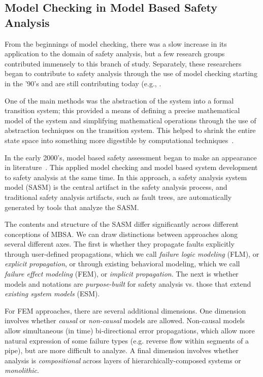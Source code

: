 \subsection{Model Checking in Model Based Safety Analysis}
From the beginnings of model checking, there was a slow increase in its application to the domain of safety analysis, but a few research groups contributed immensely to this branch of study. Separately, these researchers began to contribute to safety analysis through the use of model checking starting in the '90's and are still contributing today (e.g., \cite{reese1997software,signoret1998altarica,chiappini1999formal,cimatti2000industrial}. 

One of the main methods was the abstraction of the system into a formal transition system; this provided a means of defining a precise mathematical model of the system and simplifying mathematical operations through the use of abstraction techniques on the transition system. This helped to shrink the entire state space into something more digestible by computational techniques~\cite{d2008survey}. 

In the early 2000's, model based safety assessment began to make an appearance in literature~\cite{Bozzano:2010:DSA:1951720,Joshi05:Dasc, Joshi05:SafeComp, Joshi07:Hase}. This applied model checking and model based system development to safety analysis at the same time.  In this approach, a safety analysis system model (SASM) is the central artifact in the safety analysis process, and traditional safety analysis artifacts, such as fault trees, are automatically generated by tools that analyze the SASM.

The contents and structure of the SASM differ significantly across different conceptions of MBSA.  We can draw distinctions between approaches along several different axes.  The first is whether they propagate faults explicitly through user-defined propagations, which we call {\em failure logic modeling} (FLM), or {\em explicit propagation}, or through existing behavioral modeling, which we call {\em failure effect modeling} (FEM), or {\em implicit propagation}.  The next is whether models and notations are {\em purpose-built} for safety analysis vs. those that extend {\em existing system models} (ESM).

For FEM approaches, there are several additional dimensions.  One dimension involves whether {\em causal} or {\em non-causal} models are allowed.  Non-causal models allow simultaneous (in time) bi-directional error propagations, which allow more natural expression of some failure types (e.g. reverse flow within segments of a pipe), but are more difficult to analyze.  A final dimension involves whether analysis is {\em compositional} across layers of hierarchically-composed systems or {\em monolithic}.  %

